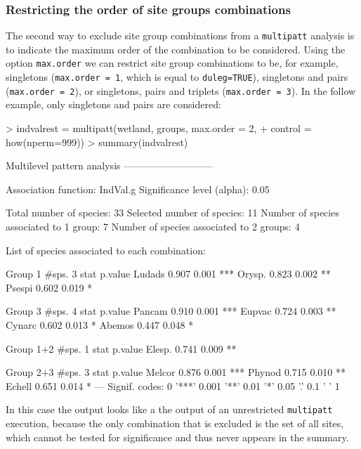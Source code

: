 \documentclass[11pt,a4paper]{article}
\begin{document}
\subsubsection{Restricting the order of site groups combinations}
The second way to exclude site group combinations from a \texttt{multipatt} analysis is to indicate the maximum order of the combination to be considered. Using the option \texttt{max.order} we can restrict site group combinations to be, for example, singletons (\texttt{max.order = 1}, which is equal to \texttt{duleg=TRUE}), singletons and pairs (\texttt{max.order = 2}), or singletons, pairs and triplets (\texttt{max.order = 3}). In the follow example, only singletons and pairs are considered: 
\begin{Schunk}
\begin{Sinput}
> indvalrest = multipatt(wetland, groups, max.order = 2, 
+                        control = how(nperm=999)) 
> summary(indvalrest)
\end{Sinput}
\begin{Soutput}
 Multilevel pattern analysis
 ---------------------------

 Association function: IndVal.g
 Significance level (alpha): 0.05

 Total number of species: 33
 Selected number of species: 11 
 Number of species associated to 1 group: 7 
 Number of species associated to 2 groups: 4 

 List of species associated to each combination: 

 Group 1  #sps.  3 
        stat p.value    
Ludads 0.907   0.001 ***
Orysp. 0.823   0.002 ** 
Psespi 0.602   0.019 *  

 Group 3  #sps.  4 
        stat p.value    
Pancam 0.910   0.001 ***
Eupvac 0.724   0.003 ** 
Cynarc 0.602   0.013 *  
Abemos 0.447   0.048 *  

 Group 1+2  #sps.  1 
        stat p.value   
Elesp. 0.741   0.009 **

 Group 2+3  #sps.  3 
        stat p.value    
Melcor 0.876   0.001 ***
Phynod 0.715   0.010 ** 
Echell 0.651   0.014 *  
---
Signif. codes:  0 '***' 0.001 '**' 0.01 '*' 0.05 '.' 0.1 ' ' 1 
\end{Soutput}
\end{Schunk}
In this case the output looks like a the output of an unrestricted \texttt{multipatt} execution, because the only combination that is excluded is the set of all sites, which cannot be tested for significance and thus never appears in the summary. 
\end{document}

